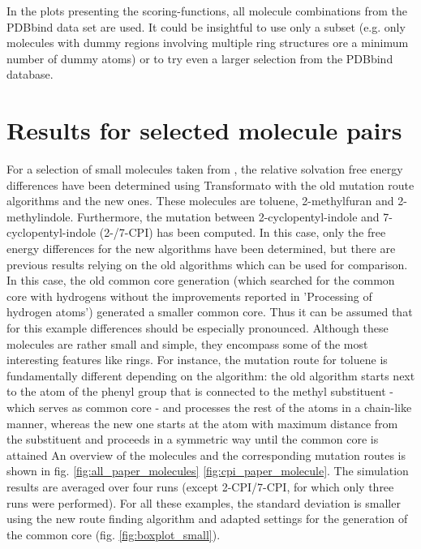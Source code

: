 In the plots presenting the scoring-functions, all molecule combinations
from the PDBbind data set are used. It could be insightful to use
only a subset (e.g. only molecules with dummy regions involving multiple
ring structures ore a minimum number of dummy atoms) or to try even a larger selection from the PDBbind database.

\section{Results for selected molecule pairs}

For a selection of small molecules taken from \cite{Loeffler.2018, Wieder.2022}, the relative solvation free energy differences have been determined using Transformato with the old mutation route algorithms and the new ones. These molecules are toluene, 2-methylfuran and 2-methylindole.
Furthermore, the mutation between 2-cyclopentyl-indole and 7-cyclopentyl-indole (2-/7-CPI) has been computed. In this case, only the free energy differences for the new algorithms have been determined, but there are previous results relying on the old algorithms which can be used for comparison. In this case, the old common core generation (which searched for the common core with hydrogens without the improvements reported in 'Processing of hydrogen atoms') generated a smaller common core. Thus it can be assumed that for this example differences should be especially pronounced.
Although these molecules are rather small and simple, they encompass some of the most interesting features like rings. For instance, the mutation route for toluene is fundamentally different depending on the algorithm: the old algorithm starts next to the atom of the phenyl group that is connected to the methyl substituent - which serves as common core - and processes the rest of the atoms in a chain-like manner, whereas the new one starts at the atom with maximum distance from the substituent and proceeds in a symmetric way until the common core is attained
An overview of the molecules and the corresponding mutation routes is shown in fig. \ref{fig:all_paper_molecules}  \ref{fig:cpi_paper_molecule}.
The simulation results are averaged over four runs (except 2-CPI/7-CPI, for which only three runs were performed). 
For all these examples, the standard deviation is smaller using the new route finding algorithm and adapted settings for the generation of the common core (fig. \ref{fig:boxplot_small}).


